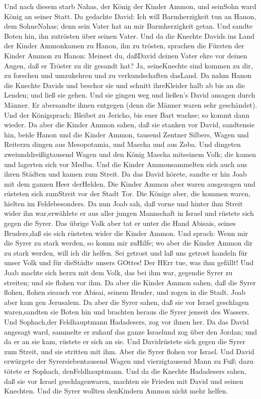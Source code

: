  Und nach diesem starb Nahas, der König der Kinder Ammon,
und seinSohn ward König an seiner Statt.  Da gedachte David:
Ich will Barmherzigkeit tun an Hanon, dem SohneNahas; denn sein Vater
hat an mir Barmherzigkeit getan. Und sandte Boten hin, ihn zutrösten
über seinen Vater. Und da die Knechte Davids ins Land der Kinder
Ammonkamen zu Hanon, ihn zu trösten,  sprachen die Fürsten
der Kinder Ammon zu Hanon: Meinest du, daßDavid deinen Vater ehre vor
deinen Augen, daß er Tröster zu dir gesandt hat? Ja, seineKnechte sind
kommen zu dir, zu forschen und umzukehren und zu verkundschaften
dasLand.  Da nahm Hanon die Knechte Davids und beschor sie
und schnitt ihreKleider halb ab bis an die Lenden; und ließ sie gehen.
 Und sie gingen weg und ließen's David ansagen durch Männer.
Er abersandte ihnen entgegen (denn die Männer waren sehr geschändet).
Und der Königsprach: Bleibet zu Jericho, bis euer Bart wachse; so kommt
dann wieder.  Da aber die Kinder Ammon sahen, daß sie
stanken vor David, sandtensie hin, beide Hanon und die Kinder Ammon,
tausend Zentner Silbers, Wagen und Reiterzu dingen aus Mesopotamia, und
Maecha und aus Zoba.  Und dingeten zweiunddreißigtausend
Wagen und den König Maecha mitseinem Volk; die kamen und lagerten sich
vor Medba. Und die Kinder Ammonsammelten sich auch aus ihren Städten und
kamen zum Streit.  Da das David hörete, sandte er hin Joab
mit dem ganzen Heer derHelden.  Die Kinder Ammon aber waren
ausgezogen und rüsteten sich zumStreit vor der Stadt Tor. Die Könige
aber, die kommen waren, hielten im Feldebesonders.  Da nun
Joab sah, daß vorne und hinter ihm Streit wider ihn war,erwählete er aus
aller jungen Mannschaft in Israel und rüstete sich gegen die Syrer.
 Das übrige Volk aber tat er unter die Hand Abisais, seines
Bruders,daß sie sich rüsteten wider die Kinder Ammon.  Und
sprach: Wenn mir die Syrer zu stark werden, so komm mir zuHilfe; wo aber
die Kinder Ammon dir zu stark werden, will ich dir helfen. 
Sei getrost und laß uns getrost handeln für unser Volk und für dieStädte
unsers GOttes! Der HErr tue, was ihm gefällt!  Und Joab
machte sich herzu mit dem Volk, das bei ihm war, gegendie Syrer zu
streiten; und sie flohen vor ihm.  Da aber die Kinder Ammon
sahen, daß die Syrer flohen, flohen sieauch vor Abisai, seinem Bruder,
und zogen in die Stadt. Joab aber kam gen Jerusalem.  Da
aber die Syrer sahen, daß sie vor Israel geschlagen waren,sandten sie
Boten hin und brachten heraus die Syrer jenseit des Wassers. Und
Sophach,der Feldhauptmann Hadadesers, zog vor ihnen her. 
Da das David angesagt ward, sammelte er zuhauf das ganze Israelund zog
über den Jordan; und da er an sie kam, rüstete er sich an sie. Und
Davidrüstete sich gegen die Syrer zum Streit, und sie stritten mit ihm.
 Aber die Syrer flohen vor Israel. Und David erwürgete der
Syrersiebentausend Wagen und vierzigtausend Mann zu Fuß; dazu tötete er
Sophach, denFeldhauptmann.  Und da die Knechte Hadadesers
sahen, daß sie vor Israel geschlagenwaren, machten sie Frieden mit David
und seinen Knechten. Und die Syrer wollten denKindern Ammon nicht mehr
helfen.

